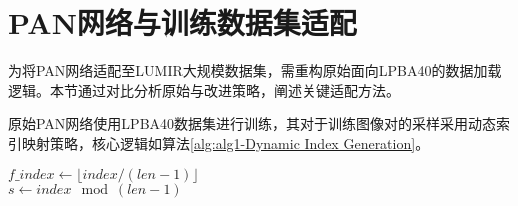 







\section{PAN网络与训练数据集适配}

为将PAN网络适配至LUMIR大规模数据集，需重构原始面向LPBA40的数据加载逻辑。本节通过对比分析原始与改进策略，阐述关键适配方法。

原始PAN网络使用LPBA40数据集进行训练，其对于训练图像对的采样采用动态索引映射策略，核心逻辑如算法\ref{alg:alg1-Dynamic Index Generation}。

\begin{algorithm}

    \label{alg:alg1-Dynamic Index Generation}

    $f\_index \gets \lfloor index / (len-1) \rfloor$ \\
    $s \gets index \mod (len-1)$ \\
\end{algorithm}


